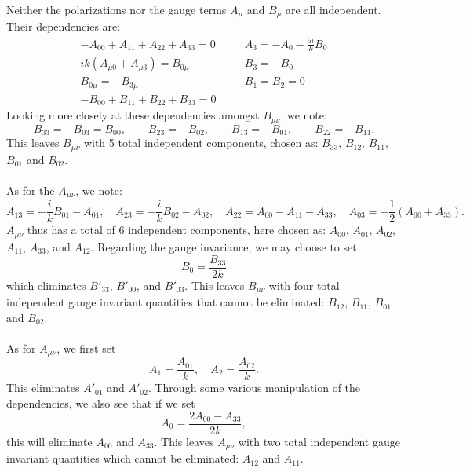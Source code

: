\documentclass[10pt,letterpaper]{article}
\begin{document}
Neither the polarizations nor the gauge terms $A_\mu$ and $B_\mu$ are all independent. Their dependencies are:
\begin{align}
-A_{00} + A_{11}+A_{22} + A_{33} = 0&\quad&A_3 = -A_0 - \frac{5i}{k} B_0\nonumber\\
ik(A_{\mu 0} + A_{\mu 3}) = B_{0\mu} &\quad &B_3 = -B_0 \nonumber\\
B_{0\mu} = -B_{3\mu}&\quad& B_{1}=B_2 = 0\nonumber\\
-B_{00} + B_{11}+B_{22} + B_{33} = 0&\quad&
\end{align}
Looking more closely at these dependencies amongst $B_{\mu\nu}$, we note:
\begin{equation}
B_{33} = -B_{03} = B_{00},\qquad B_{23} = -B_{02},\qquad B_{13} = -B_{01},\qquad B_{22} = -B_{11}.
\end{equation}
This leaves $B_{\mu\nu}$ with 5 total independent components, chosen as: $B_{33}$, $B_{12}$, $B_{11}$, $B_{01}$ and $B_{02}$. 
\\ \\
As for the $A_{\mu\nu}$, we note:
\begin{equation}
A_{13} = -\frac{i}{k} B_{01} - A_{01},\quad
A_{23} = -\frac{i}{k}B_{02} - A_{02},\quad
A_{22} = A_{00} - A_{11} - A_{33},\quad
A_{03} = - \frac12 (A_{00}+A_{33}).
\end{equation}
$A_{\mu\nu}$ thus has a total of 6 independent components, here chosen as: $A_{00}$, $A_{01}$, $A_{02}$, $A_{11}$, $A_{33}$, and $A_{12}$. 
Regarding the gauge invariance, we may choose to set 
\begin{equation}
B_0 = \frac{B_{33}}{2k}
\end{equation}
which eliminates $B'_{33}$, $B'_{00}$, and $B'_{03}$. This leaves $B_{\mu\nu}$ with four total independent gauge invariant quantities that cannot be eliminated: $B_{12}$, $B_{11}$, $B_{01}$ and $B_{02}$. 
\\ \\
As for $A_{\mu\nu}$, we first set 
\begin{equation}
A_1 = \frac{A_{01}}{k},\quad A_2 = \frac{A_{02}}{k}.
\end{equation}
This eliminates $A'_{01}$ and $A'_{02}$. Through some various manipulation of the dependencies, we also see that if we set
\begin{equation}
A_0 = \frac{2A_{00} - A_{33}}{2k},
\end{equation}
this will eliminate $A_{00}$ and $A_{33}$. This leaves $A_{\mu\nu}$ with two total independent gauge invariant quantities which cannot be eliminated: $A_{12}$ and $A_{11}$. 
\end{document}
